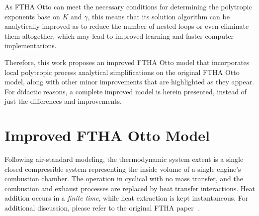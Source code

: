     As FTHA Otto can meet the necessary conditions for determining the polytropic exponents base on $K$ and $\gamma$, this means
    that its solution algorithm can be analytically improved as to reduce the number of nested  loops  or  even  eliminate  them
    altogether, which may lead to improved learning and faster computer implementations.

    Therefore, this  work  proposes  an  improved  FTHA  Otto  model  that  incorporates  local  polytropic  process  analytical
    simplifications on the original FTHA Otto model, along with other minor improvements that are highlighted  as  they  appear.
    For didactic reasons, a complete improved model is herein presented, instead of just the differences and improvements.



\section{Improved FTHA Otto Model}

    Following air-standard modeling, the thermodynamic system extent is a single closed  compressible  system  representing  the
    inside volume of a single engine's combustion chamber. The operation in cyclical with no mass transfer, and  the  combustion
    and exhaust processes are replaced by heat transfer interactions. Heat addition occurs in a \emph{finite time},  while  heat
    extraction   is   kept   instantaneous.   For   additional   discussion,    please    refer    to    the    original    FTHA
    paper~\cite{2017-NaaktgeborenC-IntJMechEngEduc}.

